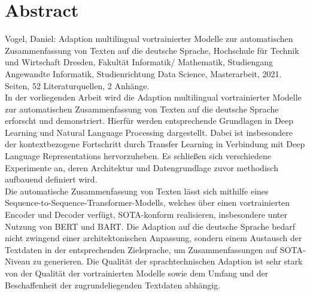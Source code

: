 \chapter*{Abstract}
\thispagestyle{empty}

\noindent
Vogel, Daniel: Adaption multilingual vortrainierter Modelle zur automatischen Zusammenfassung von Texten auf die deutsche Sprache, Hochschule für Technik und Wirtschaft Dresden, Fakultät Informatik/ Mathematik, Studiengang Angewandte Informatik, Studienrichtung Data Science, Masterarbeit, 2021.\\[1ex]

 Seiten, 52 Literaturquellen, 2 Anhänge.\\[30ex]

\noindent
In der vorliegenden Arbeit wird die Adaption multilingual vortrainierter Modelle zur automatischen Zusammenfassung von Texten auf die deutsche Sprache erforscht und demonstriert. Hierfür werden entsprechende Grundlagen in Deep Learning und Natural Language Processing dargestellt. Dabei ist insbesondere der kontextbezogene Fortschritt durch Transfer Learning in Verbindung mit Deep Language Representations hervorzuheben. Es schließen sich verschiedene Experimente an, deren Architektur und Datengrundlage zuvor methodisch aufbauend definiert wird.\\

\noindent
Die automatische Zusammenfassung von Texten lässt sich mithilfe eines Sequence-to-Sequence-Transformer-Modells, welches über einen vortrainierten Encoder und Decoder verfügt, SOTA-konform realisieren, insbesondere unter Nutzung von BERT und BART. Die Adaption auf die deutsche Sprache bedarf nicht zwingend einer architektonischen Anpassung, sondern einem Austausch der Textdaten in der entsprechenden Zielsprache, um Zusammenfassungen auf SOTA-Niveau zu generieren. Die Qualität der sprachtechnischen Adaption ist sehr stark von der Qualität der vortrainierten Modelle sowie dem Umfang und der Beschaffenheit der zugrundeliegenden Textdaten abhängig.
